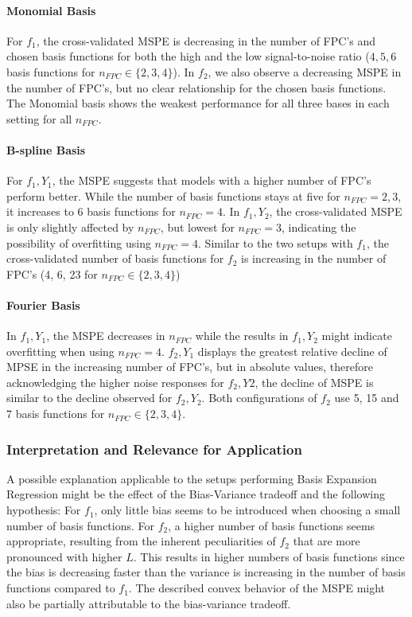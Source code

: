\documentclass[11pt,twoside,a4paper]{article}
\begin{document}
	\paragraph{Monomial Basis}
	For $f_1$, the cross-validated MSPE is decreasing in the number of FPC's and chosen basis functions for both the high and the low signal-to-noise ratio ($4,5,6$ basis functions for $n_{FPC} \in \{2, 3, 4 \}$). In  $f_2$, we also observe a decreasing MSPE in the number of FPC's, but no clear relationship for the chosen basis functions. The Monomial basis shows the weakest performance for all three bases in each setting for all $n_{FPC}$.
	\vspace{-0.2cm}
	
	\paragraph{B-spline Basis}
	For $f_1,Y_1$, the MSPE suggests that models with a higher number of FPC's perform better. While the number of basis functions stays at five for $n_{FPC} = 2,3$, it increases to 6 basis functions for $n_{FPC} = 4$. In $f_1,Y_2$, the cross-validated MSPE is only slightly affected by $n_{FPC}$, but lowest for $n_{FPC} = 3$, indicating the possibility of overfitting using $n_{FPC} = 4$. Similar to the two setups with $f_1$, the cross-validated number of basis functions for $f_2$ is increasing in the number of FPC's (4, 6, 23 for $n_{FPC} \in \{2, 3, 4 \}$)
	\vspace{-0.2cm}
	
	\paragraph{Fourier Basis}
	In $f_1,Y_1$, the MSPE decreases in $n_{FPC}$ while the results in $f_1,Y_2$ might indicate overfitting when using $n_{FPC} = 4$. $f_2,Y_1$ displays the greatest relative decline of MPSE in the increasing number of FPC's, but in absolute values, therefore acknowledging the higher noise responses for $f_2,Y2$, the decline of MSPE is similar to the decline observed for $f_2,Y_2$. Both configurations of $f_2$ use 5, 15 and 7 basis functions for $n_{FPC} \in \{2, 3, 4 \}$.
	\vspace{-0.2cm}	
	
	\subsubsection{Interpretation and Relevance for Application}
	A possible explanation applicable to the setups performing Basis Expansion Regression might be the effect of the Bias-Variance tradeoff and the following hypothesis: For $f_1$, only little bias seems to be introduced when choosing a small number of basis functions. For $f_2$, a higher number of basis functions seems appropriate, resulting from the inherent peculiarities of $f_2$ that are more pronounced with higher $L$. This results in higher numbers of basis functions since the bias is decreasing faster than the variance is increasing in the number of basis functions compared to $f_1$. The described convex behavior of the MSPE might also be partially attributable to the bias-variance tradeoff.  
	
\end{document}
